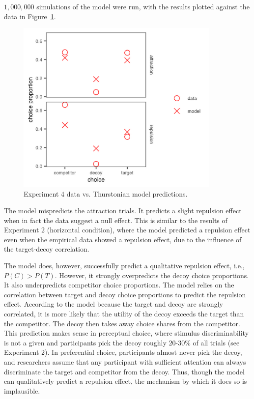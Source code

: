 $1,000,000$ simulations of the model were run, with the results plotted against the data in Figure~\ref{fig:bayes_choice_sim_preds}.

\begin{figure}
    \includegraphics[scale=.5,width=100mm]{figures/bayes_choice_sim_preds.jpeg}
    \caption{Experiment 4 data vs. Thurstonian model predictions.}
    \label{fig:bayes_choice_sim_preds}
\end{figure}

The model mispredicts the attraction trials. It predicts a slight repulsion effect when in fact the data suggest a null effect. This is similar to the results of Experiment 2 (horizontal condition), where the model predicted a repulsion effect even when the empirical data showed a repulsion effect, due to the influence of the target-decoy correlation.

The model does, however, successfully predict a qualitative repulsion effect, i.e., $P(C)>P(T)$. However, it strongly overpredicts the decoy choice proportions. It also underpredicts competitor choice proportions. The model relies on the correlation between target and decoy choice proportions to predict the repulsion effect. According to the model because the target and decoy are strongly correlated, it is more likely that the utility of the decoy exceeds the target than the competitor. The decoy then takes away choice shares from the competitor. This prediction makes sense in perceptual choice, where stimulus discriminability is not a given and participants pick the decoy roughly $20$-$30\%$ of all trials (see Experiment 2). In preferential choice, participants almost never pick the decoy, and researchers assume that any participant with sufficient attention can always discriminate the target and competitor from the decoy. Thus, though the model can qualitatively predict a repulsion effect, the mechanism by which it does so is implausible.

